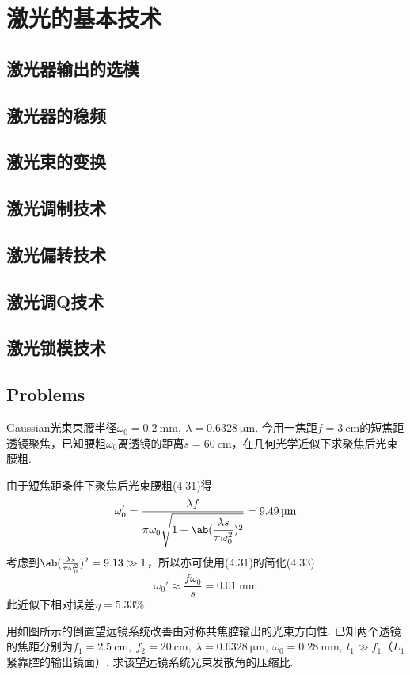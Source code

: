\chapter{激光的基本技术}
\section{激光器输出的选模}
\section{激光器的稳频}
\section{激光束的变换}
\section{激光调制技术}
\section{激光偏转技术}
\section{激光调Q技术}
\section{激光锁模技术}
\newpage
\section*{Problems}
\begin{problem}
	Gaussian光束束腰半径$\omega_0=\SI{0.2}{\mm},\ \lambda=\SI{0.6328}{\um}$. 今用一焦距$f=\SI{3}{\cm}$的短焦距透镜聚焦，已知腰粗$\omega_0$离透镜的距离$s=\SI{60}{\cm}$，在几何光学近似下求聚焦后光束腰粗.
\end{problem}
\begin{solution}
由于短焦距条件下聚焦后光束腰粗(4.31)得
\[\omega_0'=\frac{\lambda f}{\pi\omega_0\sqrt{1+\ab(\dfrac{\lambda s}{\pi\omega_0^2})^2}}=\SI{9.49}{\um}\]
考虑到$\ab(\frac{\lambda s}{\pi\omega_0^2})^2=9.13\gg 1$，所以亦可使用(4.31)的简化(4.33)
\[\omega_0'\approx\frac{f\omega_0}{s}=\SI{0.01}{\mm}\]
此近似下相对误差$\eta=5.33\%$.
\end{solution}

\begin{paracol}{2}
\begin{problem}
    用如图所示的倒置望远镜系统改善由对称共焦腔输出的光束方向性. 已知两个透镜的焦距分别为$f_1=\SI{2.5}{\cm},\ f_2=\SI{20}{\cm},\ \lambda=\SI{0.6328}{\um},\ \omega_0=\SI{0.28}{\mm},\ l_1\gg f_1$（$L_1$紧靠腔的输出镜面）. 求该望远镜系统光束发散角的压缩比.
\end{problem}
\switchcolumn\centering
\vfill
\begin{tikzpicture}

\end{tikzpicture}
\vfill
\end{paracol}
\begin{solution}
    
\end{solution}